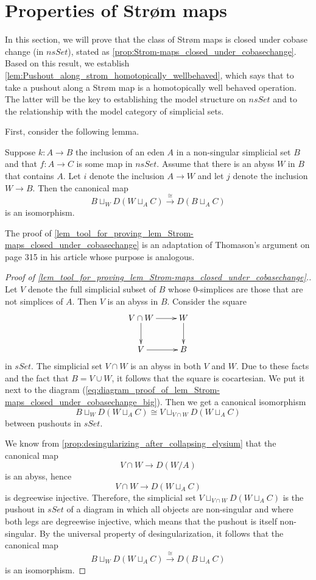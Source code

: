 

\section{Properties of Str\o m maps}
\label{sec:properties}

In this section, we will prove that the class of Str\o m maps is closed under cobase change (in $nsSet$), stated as \cref{prop:Strom-maps_closed_under_cobasechange}. Based on this result, we establish \cref{lem:Pushout_along_strom_homotopically_wellbehaved}, which says that to take a pushout along a Str\o m map is a homotopically well behaved operation. The latter will be the key to establishing the model structure on $nsSet$ and to the relationship with the model category of simplicial sets.

First, consider the following lemma.
\begin{lemma}
\label{lem_tool_for_proving_lem_Strom-maps_closed_under_cobasechange}
Suppose $k:A\to B$ the inclusion of an eden $A$ in a non-singular simplicial set $B$ and that $f:A\to C$ is some map in $nsSet$. Assume that there is an abyss $W$ in $B$ that contains $A$. Let $i$ denote the inclusion $A\to W$ and let $j$ denote the inclusion $W\to B$. Then the canonical map
\[B\sqcup _WD(W\sqcup _AC)\xrightarrow{\cong } D(B\sqcup _AC)\]
is an isomorphism.
\end{lemma}
\noindent The proof of \cref{lem_tool_for_proving_lem_Strom-maps_closed_under_cobasechange} is an adaptation of Thomason's argument on page 315 in his article \cite{Th80} whose purpose is analogous.
\begin{proof}[Proof of \cref{lem_tool_for_proving_lem_Strom-maps_closed_under_cobasechange}.]
Let $V$ denote the full simplicial subset of $B$ whose $0$-simplices are those that are not simplices of $A$. Then $V$ is an abyss in $B$. Consider the square
\begin{displaymath}
\xymatrix{
V\cap W \ar[d] \ar[r] & W \ar[d] \\
V \ar[r] & B
}
\end{displaymath}
in $sSet$. The simplicial set $V\cap W$ is an abyss in both $V$ and $W$. Due to these facts and the fact that $B=V\cup W$, it follows that the square is cocartesian. We put it next to the diagram (\ref{eq:diagram_proof_of_lem_Strom-maps_closed_under_cobasechange_big}). Then we get a canonical isomorphism
\[B\sqcup _WD(W\sqcup _AC)\cong V\sqcup _{V\cap W}D(W\sqcup _AC)\]
between pushouts in $sSet$.

We know from \cref{prop:desingularizing_after_collapsing_elysium} that the canonical map
\[V\cap W\to D(W/A)\]
is an abyss, hence
\[V\cap W\to D(W\sqcup _AC)\]
is degreewise injective.
Therefore, the simplicial set $V\sqcup _{V\cap W}D(W\sqcup _AC)$ is the pushout in $sSet$ of a diagram in which all objects are non-singular and where both legs are degreewise injective, which means that the pushout is itself non-singular. By the universal property of desingularization, it follows that the canonical map
\[B\sqcup _WD(W\sqcup _AC)\xrightarrow{\cong } D(B\sqcup _AC)\]
is an isomorphism.
\end{proof}
